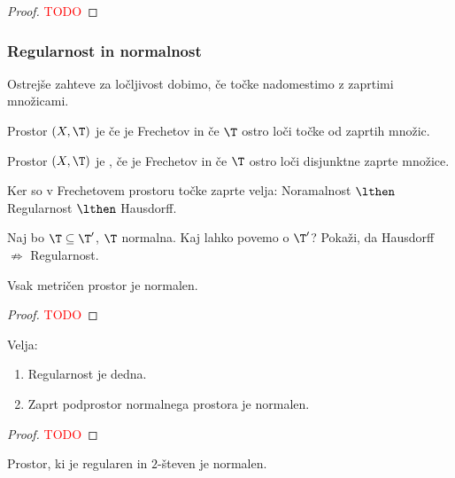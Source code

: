 \begin{proof}
    \textcolor{red}{TODO}
\end{proof}

\subsubsection{Regularnost in normalnost}
Ostrejše zahteve za ločljivost dobimo, če točke nadomestimo z zaprtimi množicami.
\begin{definicija}
    Prostor $(X, \T)$ je  če je Frechetov in če $\T$ ostro loči točke od zaprtih množic.
\end{definicija}

\begin{definicija}
    Prostor $(X, \T)$ je , če je Frechetov in če $\T$ ostro loči disjunktne zaprte množice.
\end{definicija}

\begin{opomba}
    Ker so v Frechetovem prostoru točke zaprte velja: Noramalnost $\lthen$ Regularnost $\lthen$ Hausdorff.
\end{opomba}

\begin{primer}
    Naj bo $\T \subseteq \T'$, $\T$ normalna. Kaj lahko povemo o $\T'$?    Pokaži, da Hausdorff $\nRightarrow$ Regularnost.
\end{primer}

\begin{trditev}
    Vsak metričen prostor je normalen.
\end{trditev}

\begin{proof}
    \textcolor{red}{TODO}
\end{proof}

\begin{trditev}
    Velja:
    \begin{enumerate}
        \item Regularnost je dedna.
        \item Zaprt podprostor normalnega prostora je normalen.
    \end{enumerate}    
\end{trditev}

\begin{proof}
    \textcolor{red}{TODO}
\end{proof}

\begin{izrek}
    Prostor, ki je regularen in $2$-števen je normalen.
\end{izrek}


